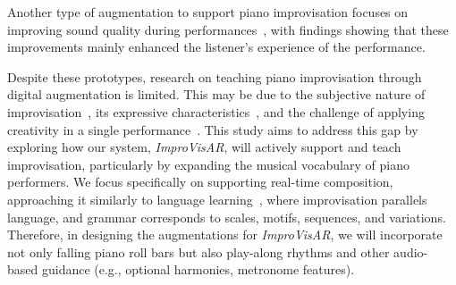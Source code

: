 \documentclass{vgtc}                          %
\begin{document}
Another type of augmentation %
to support piano improvisation focuses on improving sound quality during performances~\cite{dahlstedt2015mapping, yang2012augmented, yang2013visual}, %
with findings showing that these improvements mainly enhanced the listener's experience of the performance.

\par
Despite these prototypes, research on teaching piano improvisation through digital augmentation is limited. This may be due to the subjective nature of improvisation~\cite{laroche2014enacting}, its expressive characteristics~\cite{donahue2019piano,xia2017improvised}, and the challenge of applying creativity in a single performance~\cite{solis2009musical, smith1983homer}. %
    This study aims to address this gap by exploring how our system, \textit{ImproVisAR}, will actively support and teach improvisation, particularly by expanding the musical vocabulary of piano performers. We focus specifically on supporting real-time composition, approaching it similarly to language learning~\cite{deja2024teach}, where improvisation parallels language, and grammar corresponds to scales, motifs, sequences, and variations. Therefore, in designing the augmentations for \textit{ImproVisAR}, we will incorporate not only falling piano roll bars but also play-along rhythms and other audio-based guidance (e.g., optional harmonies, metronome features).
\end{document}
